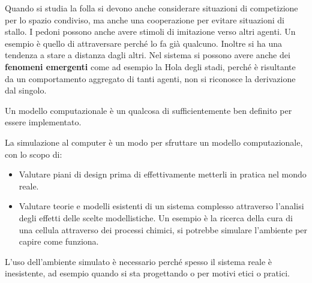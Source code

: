 Quando si studia la folla si devono anche considerare situazioni di competizione
per lo spazio condiviso, ma anche una cooperazione per evitare situazioni di
stallo. I pedoni possono anche avere stimoli di imitazione verso altri agenti.
Un esempio è quello di attraversare perché lo fa già qualcuno. Inoltre si ha una
tendenza a stare a distanza dagli altri. Nel sistema si possono avere anche
dei \textbf{fenomeni emergenti} come ad esempio la Hola degli stadi, perché è
risultante da un comportamento aggregato di tanti agenti, non si riconosce la
derivazione dal singolo.
\begin{definizione}
    Un modello computazionale è un qualcosa di sufficientemente ben definito per
    essere implementato.
\end{definizione}
\begin{definizione}
    La simulazione al computer è un modo per sfruttare un modello computazionale,
    con lo scopo di:
    \begin{itemize}
        \item Valutare piani di design prima di effettivamente metterli in pratica
              nel mondo reale.
        \item Valutare teorie e modelli esistenti di un sistema complesso attraverso
              l'analisi degli effetti delle scelte modellistiche. Un esempio è la
              ricerca della cura di una cellula attraverso dei processi chimici,
              si potrebbe simulare l'ambiente per capire come funziona.
    \end{itemize}
\end{definizione}
L'uso dell'ambiente simulato è necessario perché spesso il sistema reale è
inesistente, ad esempio quando si sta progettando o per motivi etici o pratici.

